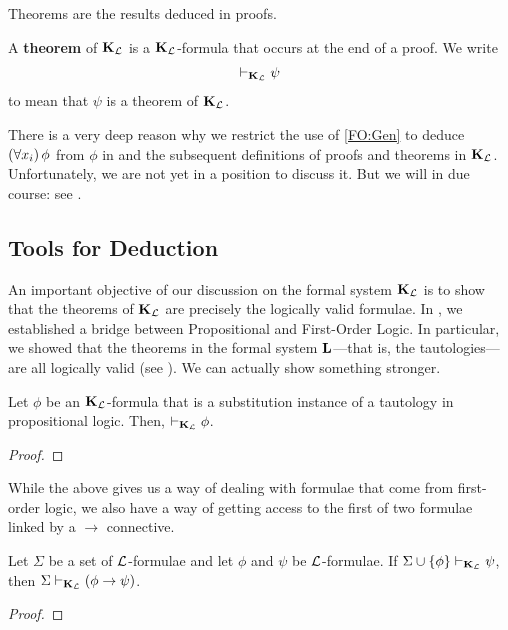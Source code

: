Theorems are the results deduced in proofs.

\begin{boxdefinition}[Theorems in $\KL$]
    A \textbf{theorem} of $\KL$ is a $\KL$-formula that occurs at the end of a proof. We write
    \begin{align*}
        \vdash_{\mathbf{K}_{\mathcal{L}}} \psi
    \end{align*}
    to mean that $\psi$ is a theorem of $\KL$.
\end{boxdefinition}

There is a very deep reason why we restrict the use of \ref{FO:Gen} to deduce $\left( \forall x_i \right)\phi$ from $\phi$ in  and the subsequent definitions of proofs and theorems in $\KL$. Unfortunately, we are not yet in a position to discuss it. But we will in due course: see .

\subsection{Tools for Deduction}

An important objective of our discussion on the formal system $\KL$ is to show that the theorems of $\KL$ are precisely the logically valid formulae. In , we established a bridge between Propositional and First-Order Logic. In particular, we showed that the theorems in the formal system $\mathbf{L}$---that is, the tautologies---are all logically valid (see ). We can actually show something stronger.

\begin{boxtheorem}\label{Ch2:Thm:L_Tauto_Thm_FO}
    Let $\phi$ be an $\KL$-formula that is a substitution instance of a tautology in propositional logic. Then, $\vdash_{\mathbf{K}_{\mathcal{L}}} \phi$.
\end{boxtheorem}
\begin{proof}
    \sorry %
\end{proof}

While the above gives us a way of dealing with formulae that come from first-order logic, we also have a way of getting access to the first of two formulae linked by a $\to$ connective.

\begin{boxtheorem}\label{Ch2:Thm:Deduction}
    Let $\Sigma$ be a set of $\mathcal{L}$-formulae and let $\phi$ and $\psi$ be $\mathcal{L}$-formulae. If $\Sigma \cup \left\{ \phi \right\} \vdash_{\mathbf{K}_{\mathcal{L}}} \psi$, then $\Sigma \vdash_{\mathbf{K}_{\mathcal{L}}} \left( \phi \to \psi \right)$.
\end{boxtheorem}
\begin{proof}
    \sorry %
\end{proof}



